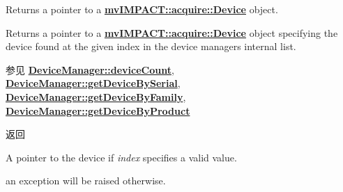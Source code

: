 Returns a pointer to a {\bfseries \hyperlink{classmv_i_m_p_a_c_t_1_1acquire_1_1_device}{mv\+I\+M\+P\+A\+C\+T\+::acquire\+::\+Device}} object. 

Returns a pointer to a {\bfseries \hyperlink{classmv_i_m_p_a_c_t_1_1acquire_1_1_device}{mv\+I\+M\+P\+A\+C\+T\+::acquire\+::\+Device}} object specifying the device found at the given index in the device managers internal list.

\begin{DoxySeeAlso}{参见}
{\bfseries \hyperlink{classmv_i_m_p_a_c_t_1_1acquire_1_1_device_manager_a1d58b307ac5a3648cb6a0e8d5d3b37ab}{Device\+Manager\+::device\+Count}}, ~\newline
{\bfseries \hyperlink{classmv_i_m_p_a_c_t_1_1acquire_1_1_device_manager_a7bf58516da0597acf3d899981e52aa92}{Device\+Manager\+::get\+Device\+By\+Serial}}, ~\newline
{\bfseries \hyperlink{classmv_i_m_p_a_c_t_1_1acquire_1_1_device_manager_a8ffbf3573bd8836d2583b271b5f43834}{Device\+Manager\+::get\+Device\+By\+Family}}, ~\newline
{\bfseries \hyperlink{classmv_i_m_p_a_c_t_1_1acquire_1_1_device_manager_a61b35d3c0ebbf79dc15d8704d6e772ad}{Device\+Manager\+::get\+Device\+By\+Product}} 
\end{DoxySeeAlso}
\begin{DoxyReturn}{返回}

\begin{DoxyItemize}
\item A pointer to the device if {\itshape index} specifies a valid value. ~\newline

\item an exception will be raised otherwise. 
\end{DoxyItemize}
\end{DoxyReturn}

